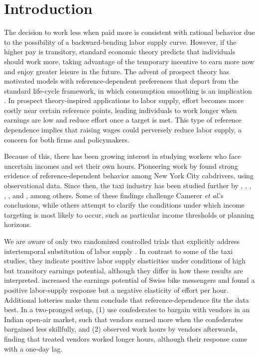 \documentclass[12pt]{article}
\begin{document}
\clearpage
\doublespacing

\pagebreak

\section{Introduction}
The decision to work less when paid more is consistent with rational behavior due to the possibility of a backward-bending labor supply curve. However, if the higher pay is transitory, standard economic theory predicts that individuals should work more, taking advantage of the temporary incentive to earn more now and enjoy greater leisure in the future. The advent of prospect theory \citep{Kahneman1979prospect} has motivated models with reference-dependent preferences that depart from the standard life-cycle framework, in which consumption smoothing is an implication \citep[e.g.,][]{friedman1957theory, modigliani1954utility}. In prospect theory-inspired applications to labor supply, effort becomes more costly near certain reference points, leading individuals to work longer when earnings are low and reduce effort once a target is met. This type of reference dependence implies that raising wages could perversely reduce labor supply, a concern for both firms and policymakers.

Because of this, there has been growing interest in studying workers who face uncertain incomes and set their own hours. Pioneering work by \citet{camerer1997labor} found strong evidence of reference-dependent behavior among New York City cabdrivers, using observational data. Since then, the taxi industry has been studied further by \citet{farber2005tomorrow, farber2008reference, farber2015taxi}, \citet{crawford2011newyork}, \citet{agarwal2015singaporean}, \citet{martin2017when}, \citet{thakral2021daily}, and \citet{duong2023taxi}, among others. Some of these findings challenge Camerer \textit{et al}.’s conclusions, while others attempt to clarify the conditions under which income targeting is most likely to occur, such as particular income thresholds or planning horizons.

We are aware of only two randomized controlled trials that explicitly address intertemporal substitution of labor supply \citep{fehrgoette,andersen2025toward}. In contrast to some of the taxi studies, they indicate positive labor supply elasticities under conditions of high but transitory earnings potential, although they differ in how these results are interpreted. \cite{fehrgoette} increased the earnings potential of Swiss bike messengers and found a positive labor-supply response but a negative elasticity of effort per hour. Additional lotteries make them conclude that reference-dependence fits the data best. In a two-pronged setup, \cite{andersen2025toward} (1) use confederates to bargain with vendors in an Indian open-air market, such that vendors earned more when the confederates bargained less skillfully, and (2) observed work hours by vendors afterwards, finding that treated vendors worked longer hours, although their response came with a one-day lag.
\end{document}
